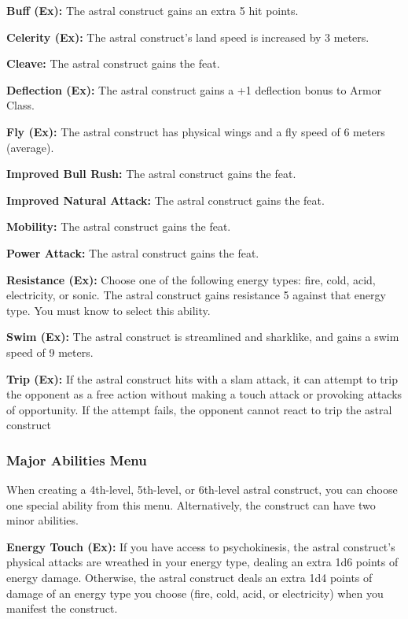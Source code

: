{	\textbf{Buff (Ex):} The astral construct gains an extra 5 hit points.

	\textbf{Celerity (Ex):} The astral construct's land speed is increased by 3 meters.

	\textbf{Cleave:} The astral construct gains the  feat.

	\textbf{Deflection (Ex):} The astral construct gains a +1 deflection bonus to Armor Class.

	\textbf{Fly (Ex):} The astral construct has physical wings and a fly speed of 6 meters (average).

	\textbf{Improved Bull Rush:} The astral construct gains the  feat.

	\textbf{Improved Natural Attack:} The astral construct gains the  feat.

	\textbf{Mobility:} The astral construct gains the  feat.

	\textbf{Power Attack:} The astral construct gains the  feat.

	\textbf{Resistance (Ex):} Choose one of the following energy types: fire, cold, acid, electricity, or sonic. The astral construct gains resistance 5 against that energy type. You must know  to select this ability.

	\textbf{Swim (Ex):} The astral construct is streamlined and sharklike, and gains a swim speed of 9 meters.

	\textbf{Trip (Ex):} If the astral construct hits with a slam attack, it can attempt to trip the opponent as a free action without making a touch attack or provoking attacks of opportunity. If the attempt fails, the opponent cannot react to trip the astral construct

\subsubsection{Major Abilities Menu}
	When creating a 4th-level, 5th-level, or 6th-level astral construct, you can choose one special ability from this menu. Alternatively, the construct can have two minor abilities. 

	\textbf{Energy Touch (Ex):} If you have access to psychokinesis, the astral construct's physical attacks are wreathed in your energy type, dealing an extra 1d6 points of energy damage. Otherwise, the astral construct deals an extra 1d4 points of damage of an energy type you choose (fire, cold, acid, or electricity) when you manifest the construct.

}
